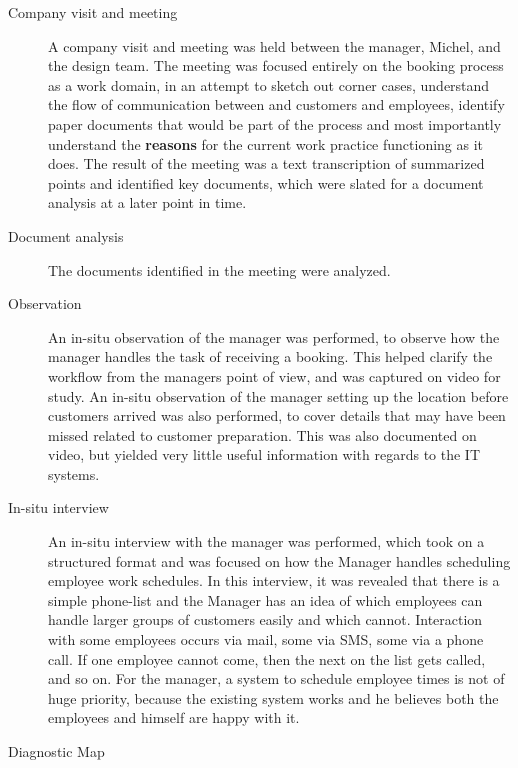 \begin{description}
    \item [Company visit and meeting] A company visit and meeting was held
        between the manager, Michel, and the design team. The meeting was
        focused entirely on the booking process as a work domain, in an attempt
        to sketch out corner cases, understand the flow of communication between
        \gomonkey{} and customers and employees, identify paper documents that
        would be part of the process and most importantly understand the
        \textbf{reasons} for the current work practice functioning as it does.
        The result of the meeting was a text transcription of summarized points
        and identified key documents, which were slated for a document analysis
        at a later point in time. 

    \item [Document analysis] The documents identified in the meeting were
        analyzed. 

    \item [Observation] An in-situ observation of the manager was performed,
        to observe how the manager handles the task of receiving a booking. This
        helped clarify the workflow from the managers point of view, and was
        captured on video for study. An in-situ observation of the manager
        setting up the location before customers arrived was also performed, to
        cover details that may have been missed related to customer preparation.
        This was also documented on video, but yielded very little useful
        information with regards to the IT systems.

    \item [In-situ interview] An in-situ interview with the manager was
        performed, which took on a structured format and was focused on how the
        Manager handles scheduling employee work schedules. In this interview,
        it was revealed that there is a simple phone-list and the Manager has an
        idea of which employees can handle larger groups of customers easily and
        which cannot. Interaction with some employees occurs via mail, some via
        SMS, some via a phone call. If one employee cannot come, then the next
        on the list gets called, and so on. For the manager, a system to
        schedule employee times is not of huge priority, because the existing
        system works and he believes both the employees and himself are happy
        with it.
    \item [Diagnostic Map] 
\end{description}

